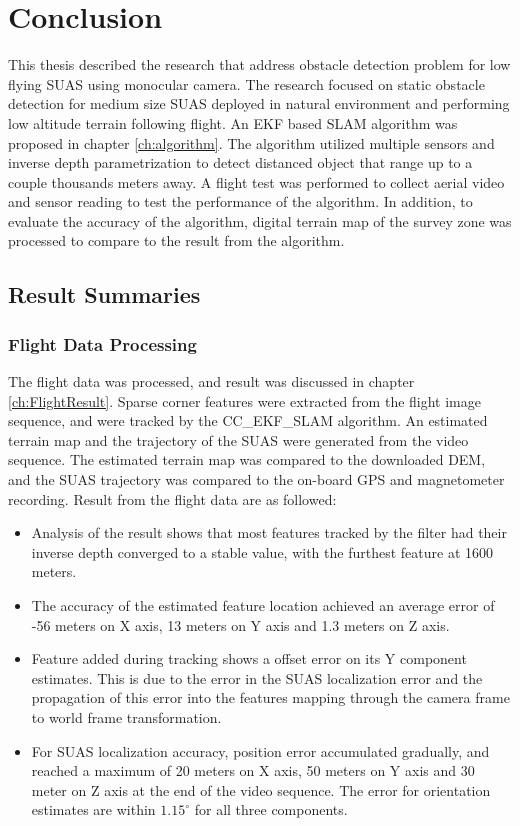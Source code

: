 \chapter{Conclusion}\label{ch:conclusion}
This thesis described the research that address obstacle detection problem for low flying SUAS using monocular camera. The research focused on static obstacle detection for medium size SUAS deployed in natural environment and performing low altitude terrain following flight.  An EKF based SLAM algorithm was proposed in chapter \ref{ch:algorithm}. The algorithm utilized multiple sensors and inverse depth parametrization to detect distanced object that range up to a couple thousands meters away. A flight test was performed to collect aerial video and sensor reading to test the performance of the algorithm. In addition, to evaluate the accuracy of the algorithm, digital terrain map of the survey zone was processed to compare to the result from the algorithm. 

\section{Result Summaries}
\subsection{Flight Data Processing}
The flight data was processed, and result was discussed in chapter \ref{ch:FlightResult}. Sparse corner features were extracted from the flight image sequence, and were tracked by the CC\_EKF\_SLAM algorithm. An estimated terrain map and the trajectory of the SUAS were generated from the video sequence. The estimated terrain map was compared to the downloaded DEM, and the SUAS trajectory was compared to the on-board GPS and magnetometer recording. Result from the flight data are as followed:
\begin{itemize}
  \item Analysis of the result shows that most features tracked by the filter had their inverse depth converged to a stable value, with the furthest feature at 1600 meters.
  \item The accuracy of the estimated feature location achieved an average error of -56 meters on X axis, 13 meters on Y axis and 1.3 meters on Z axis. 
  \item Feature added during tracking shows a offset error on its Y component estimates. This is due to the error in the SUAS localization error and the propagation of this error into the features mapping through the camera frame to world frame transformation.
  \item For SUAS localization accuracy, position error accumulated gradually, and reached a maximum of 20 meters on X axis, 50 meters on Y axis and 30 meter on Z axis at the end of the video sequence. The error for orientation estimates are within $1.15^\circ$ for all three components.
\end{itemize}

